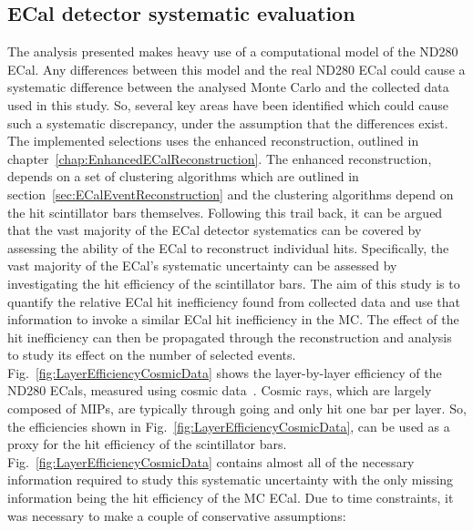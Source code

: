 \subsection{ECal detector systematic evaluation}
\label{subsec:ECalDetectorSystematic}
The analysis presented makes heavy use of a computational model of the ND280 ECal.  Any differences between this model and the real ND280 ECal could cause a systematic difference between the analysed Monte Carlo and the collected data used in this study.  So, several key areas have been identified which could cause such a systematic discrepancy, under the assumption that the differences exist.
\newline
\newline
The implemented selections uses the enhanced reconstruction, outlined in chapter~\ref{chap:EnhancedECalReconstruction}.  The enhanced reconstruction, depends on a set of clustering algorithms which are outlined in section~\ref{sec:ECalEventReconstruction} and the clustering algorithms depend on the hit scintillator bars themselves.  Following this trail back, it can be argued that the vast majority of the ECal detector systematics can be covered by assessing the ability of the ECal to reconstruct individual hits.  Specifically, the vast majority of the ECal's systematic uncertainty can be assessed by investigating the hit efficiency of the scintillator bars.  The aim of this study is to quantify the relative ECal hit inefficiency found from collected data and use that information to invoke a similar ECal hit inefficiency in the MC.  The effect of the hit inefficiency can then be propagated through the reconstruction and analysis to study its effect on the number of selected events.  Fig.~\ref{fig:LayerEfficiencyCosmicData} shows the layer-by-layer efficiency of the ND280 ECals, measured using cosmic data~\cite{1748-0221-8-10-P10019}.  Cosmic rays, which are largely composed of MIPs, are typically through going and only hit one bar per layer.  So, the efficiencies shown in Fig.~\ref{fig:LayerEfficiencyCosmicData}, can be used as a proxy for the hit efficiency of the scintillator bars.  Fig.~\ref{fig:LayerEfficiencyCosmicData} contains almost all of the necessary information required to study this systematic uncertainty with the only missing information being the hit efficiency of the MC ECal.  Due to time constraints, it was necessary to make a couple of conservative assumptions:
